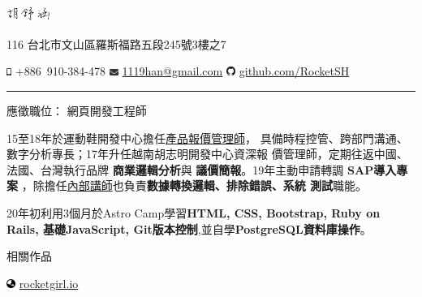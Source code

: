 \documentclass[a4paper,10pt]{article}
\begin{document}
\frenchspacing

\begin{center} 
  \Huge{\includegraphics[height=1.3em,trim=0 10mm 0 -1cm]{shared/signature.png}}\par
  \normalsize {116 台北市文山區羅斯福路五段245號3樓之7}

  \includegraphics[height=0.7em]{shared/mobile-alt.eps} +886~910-384-478 \md
  \includegraphics[width=0.8em]{shared/envelope.eps}
  \href{mailto:1119han@gmail.com}{1119han@gmail.com} \md
  \includegraphics[width=0.8em]{shared/github.eps}
  \href{https://github.com/RocketSH}{github.com/RocketSH}
\end{center}

\rule{15.2cm}{0.05em}

\vspace*{1em}
\begin{center}
  \large{應徵職位： 網頁開發工程師}
\end{center}
\vspace*{1em}

\begin{center}
  \begin{minipage}{0.9\textwidth}
    15至18年於運動鞋開發中心擔任\underline{產品報價管理師}，
        具備時程控管、跨部門溝通、數字分析專長；17年升任越南胡志明開發中心資深報
        價管理師，定期往返中國、法國、台灣執行品牌 \textbf{商業邏輯分析}與
        \textbf{議價簡報}。19年主動申請轉調 \textbf{SAP導入專案}
        ，除擔任\underline{內部講師}也負責\textbf{數據轉換邏輯、排除錯誤、系統
          測試}職能。

        \vspace*{1em}
        20年初利用3個月於Astro Camp學習\textbf{HTML, CSS, Bootstrap, Ruby on
          Rails, 基礎JavaScript, Git版本控制},並自學\textbf{PostgreSQL資料庫操作}。
  \end{minipage}
\end{center}

\vspace*{1em}
\begin{center}
  \large{相關作品}
\end{center}
\hspace*{1em}
\includegraphics[width=0.8em]{shared/globe-asia.eps}
\href{https://rocketgirl.io/}{rocketgirl.io}
\end{document}
